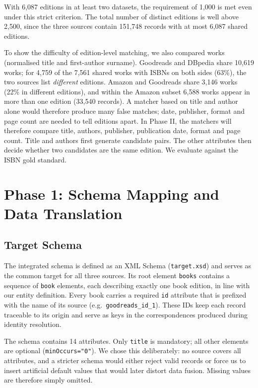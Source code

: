 \documentclass[runningheads]{llncs}
\begin{document}
With 6,087 editions in at least two datasets, the requirement of 1,000 is met
even under this strict criterion. The total number of distinct editions is
well above 2,500, since the three sources contain 151,748 records with at most
6,087 shared editions.

To show the difficulty of edition-level matching, we also compared works
(normalised title and first-author surname). Goodreads and DBpedia share
10,619 works; for 4,759 of the 7,561 shared works with ISBNs on both sides
(63\%), the two sources list \emph{different} editions. Amazon and Goodreads
share 3,146 works (22\% in different editions), and within the Amazon subset
6,588 works appear in more than one edition (33,540 records). A matcher based
on title and author alone would therefore produce many false matches; date,
publisher, format and page count are needed to tell editions apart.
In Phase II, the matchers will therefore compare title, authors, publisher, publication date, format and page count.
Title and authors first generate candidate pairs. The other attributes then decide whether two candidates are the same edition.
We evaluate against the ISBN gold standard.


\section{Phase 1: Schema Mapping and Data Translation}

\subsection{Target Schema}
The integrated schema is defined as an XML Schema (\texttt{target.xsd}) and
serves as the common target for all three sources. Its root element
\texttt{books} contains a sequence of \texttt{book} elements, each describing
exactly one book edition, in line with our entity definition. Every book
carries a required \texttt{id} attribute that is prefixed with the name of its
source (e.g.\ \texttt{goodreads\_id\_1}). These IDs keep each record traceable
to its origin and serve as keys in the correspondences produced during
identity resolution.

The schema contains 14 attributes. Only \texttt{title} is mandatory; all other
elements are optional (\texttt{minOccurs="0"}). We chose this deliberately: no
source covers all attributes, and a stricter schema would either reject valid
records or force us to insert artificial default values that would later
distort data fusion. Missing values are therefore simply omitted.
\end{document}
